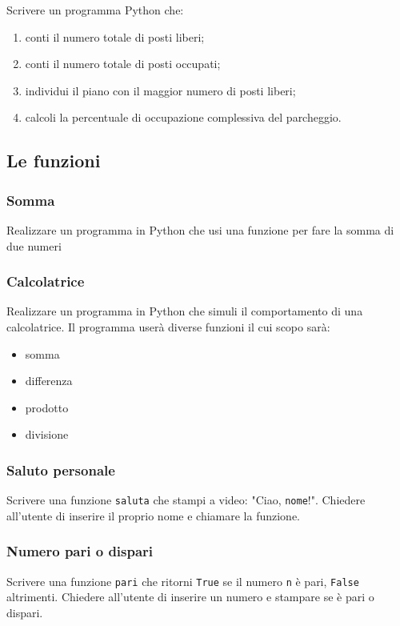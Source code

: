 \documentclass[a4paper,12pt]{article}
\begin{document}
	Scrivere un programma Python che:
	
	\begin{enumerate}
		\item conti il numero totale di posti liberi;
		\item conti il numero totale di posti occupati;
		\item individui il piano con il maggior numero di posti liberi;
		\item calcoli la percentuale di occupazione complessiva del parcheggio.
	\end{enumerate}
	
	
	\newpage
	
	\subsection{Le funzioni}
	
	\subsubsection{Somma}
	Realizzare un programma in Python che usi una funzione per fare la somma di due numeri
	
	\subsubsection{Calcolatrice}
	Realizzare un programma in Python che simuli il comportamento di una calcolatrice.
	Il programma userà diverse funzioni il cui scopo sarà:
	\begin{itemize}
		\item somma
		\item differenza
		\item prodotto
		\item divisione
	\end{itemize}
	
	\subsubsection{Saluto personale}
	Scrivere una funzione \texttt{saluta} che stampi a video: "Ciao, \texttt{nome}!".  
	Chiedere all'utente di inserire il proprio nome e chiamare la funzione.
	
	\subsubsection{Numero pari o dispari}
	Scrivere una funzione \texttt{pari} che ritorni \texttt{True} se il numero \texttt{n} è pari, \texttt{False} altrimenti.  
	Chiedere all'utente di inserire un numero e stampare se è pari o dispari.
	
\end{document}

